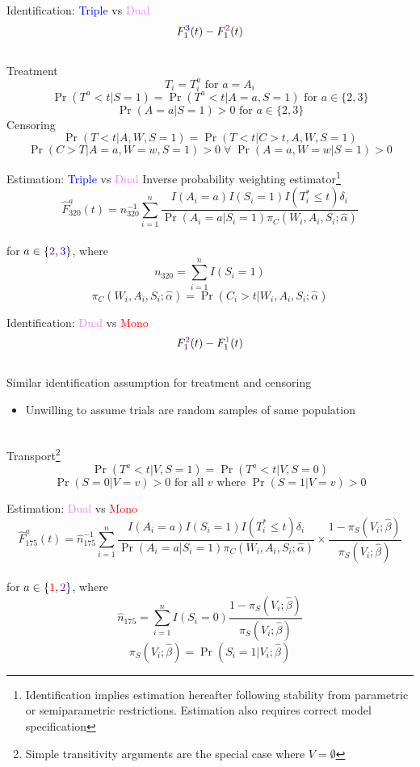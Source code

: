 \documentclass{beamer}
\newcommand{\blue}[1]{\textcolor{blue}{#1}}
\newcommand{\red}[1]{\textcolor{red}{#1}}
\newcommand{\violet}[1]{\textcolor{violet}{#1}}
\begin{document}
\begin{frame}{Identification: \blue{Triple} vs \violet{Dual}}
	\[F_1^{\blue{3}}(t) - F_1^{\violet{2}}(t)\]~\\
	Treatment	
	\[T_i = T_i^a \text{ for } a = A_i\]
	\[\Pr(T^a < t | S = 1) = \Pr(T^a < t |A=a, S=1) \text{ for } a \in \{2, 3\}\]
	\[\Pr(A = a | S=1) > 0 \text{ for } a \in \{2, 3\}\]
	Censoring
	\[\Pr(T < t |A,W,S=1) = \Pr(T < t |C>t,A,W,S=1)\]
	\[\Pr(C > T | A=a,W=w,S=1) > 0 \; \forall \; \Pr(A=a,W=w | S=1) > 0\]
\end{frame}

\begin{frame}{Estimation: \blue{Triple} vs \violet{Dual}}
	Inverse probability weighting estimator\footnote[frame]{Identification implies estimation hereafter following stability from parametric or semiparametric restrictions. Estimation also requires correct model specification}
	\[\hat{F}_{320}^{a}(t) = n_{320}^{-1} \sum_{i=1}^{n} \frac{I(A_i = a) I(S_i = 1) I(T_i^* \le t) \delta_i}{\Pr(A_i = a |S_i = 1) \pi_C(W_i, A_i, S_i; \hat{\alpha})}\]~\\
	for $a \in \{\violet{2}, \blue{3}\}$, where 
	\[n_{320} = \sum_{i=1}^{n} I(S_i = 1)\]
	\[\pi_C(W_i, A_i, S_i; \hat{\alpha}) = \Pr(C_i>t | W_i, A_i, S_i; \hat{\alpha}) \]
\end{frame}

\begin{frame}{Identification: \violet{Dual} vs \red{Mono}}
	\[F_1^{\violet{2}}(t) - F_1^{\red{1}}(t)\]~\\
	Similar identification assumption for treatment and censoring
	\begin{itemize}
		\item Unwilling to assume trials are random samples of same population
	\end{itemize}~\\
	Transport\footnote[frame]{Simple transitivity arguments are the special case where $V=\emptyset$}
	\[\Pr(T^a < t | V, S = 1) = \Pr(T^a < t | V, S=0)\]
	\[\Pr(S=0 | V=v) > 0 \text{ for all } v \text{ where } \Pr(S=1 | V=v) > 0\]
\end{frame}

\begin{frame}{Estimation: \violet{Dual} vs \red{Mono}}
	\[\hat{F}_{175}^{a}(t) = \hat{n}_{175}^{-1} \sum_{i=1}^{n} \frac{I(A_i = a) I(S_i = 1) I(T_i^* \le t) \delta_i}{\Pr(A_i = a |S_i = 1) \pi_C(W_i, A_i, S_i; \hat{\alpha})} \times \frac{1 - \pi_S(V_i; \hat{\beta})}{\pi_S(V_i; \hat{\beta})}\]~\\
	for $a \in \{\red{1}, \violet{2}\}$, where
	\[\hat{n}_{175} = \sum_{i=1}^{n} I(S_i = 0) \frac{1 - \pi_S(V_i; \hat{\beta})}{\pi_S(V_i; \hat{\beta})}\]
	\[\pi_S(V_i; \hat{\beta}) = \Pr(S_i = 1 | V_i; \hat{\beta})\]
\end{frame}
\end{document}

